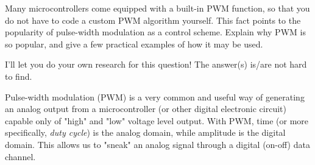 

Many microcontrollers come equipped with a built-in PWM function, so that you do not have to code a custom PWM algorithm yourself.  This fact points to the popularity of pulse-width modulation as a control scheme.  Explain why PWM is so popular, and give a few practical examples of how it may be used.







I'll let you do your own research for this question!  The answer(s) is/are not hard to find.







Pulse-width modulation (PWM) is a very common and useful way of generating an analog output from a microcontroller (or other digital electronic circuit) capable only of "high" and "low" voltage level output.  With PWM, time (or more specifically, {\it duty cycle}) is the analog domain, while amplitude is the digital domain.  This allows us to "sneak" an analog signal through a digital (on-off) data channel.




